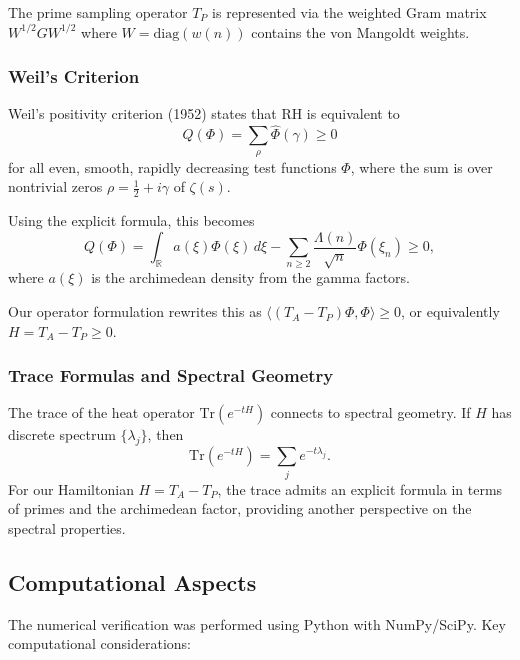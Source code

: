 The prime sampling operator $T_P$ is represented via the weighted Gram matrix $W^{1/2} G W^{1/2}$ where $W = \mathrm{diag}(w(n))$ contains the von Mangoldt weights.

\subsubsection{Weil's Criterion}

Weil's positivity criterion (1952) states that RH is equivalent to
\begin{equation}
  Q(\Phi) = \sum_\rho \widehat{\Phi}(\gamma) \geq 0
\end{equation}
for all even, smooth, rapidly decreasing test functions $\Phi$, where the sum is over nontrivial zeros $\rho = \frac{1}{2} + i\gamma$ of $\zeta(s)$.

Using the explicit formula, this becomes
\begin{equation}
  Q(\Phi) = \int_{\mathbb{R}} a(\xi) \Phi(\xi) \, d\xi - \sum_{n \geq 2} \frac{\Lambda(n)}{\sqrt{n}} \Phi(\xi_n) \geq 0,
\end{equation}
where $a(\xi)$ is the archimedean density from the gamma factors.

Our operator formulation rewrites this as $\langle (T_A - T_P) \Phi, \Phi \rangle \geq 0$, or equivalently $H = T_A - T_P \geq 0$.

\subsubsection{Trace Formulas and Spectral Geometry}

The trace of the heat operator $\mathrm{Tr}(e^{-tH})$ connects to spectral geometry. If $H$ has discrete spectrum $\{\lambda_j\}$, then
\begin{equation}
  \mathrm{Tr}(e^{-tH}) = \sum_j e^{-t\lambda_j}.
\end{equation}
For our Hamiltonian $H = T_A - T_P$, the trace admits an explicit formula in terms of primes and the archimedean factor, providing another perspective on the spectral properties.

\subsection{Computational Aspects}

The numerical verification was performed using Python with NumPy/SciPy. Key computational considerations:

